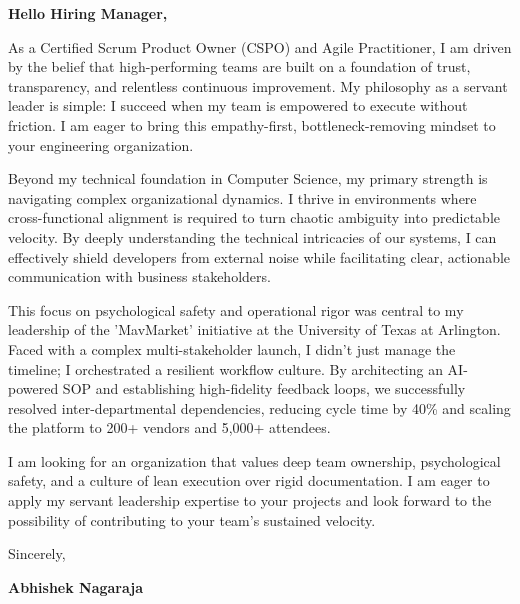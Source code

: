 \documentclass[11pt,letterpaper]{article} %
\begin{document}
\vspace{1.5em}

\textbf{Hello Hiring Manager,}

As a Certified Scrum Product Owner (CSPO) and Agile Practitioner, I am driven by the belief that high-performing teams are built on a foundation of trust, transparency, and relentless continuous improvement. My philosophy as a servant leader is simple: I succeed when my team is empowered to execute without friction. I am eager to bring this empathy-first, bottleneck-removing mindset to your engineering organization.

Beyond my technical foundation in Computer Science, my primary strength is navigating complex organizational dynamics. I thrive in environments where cross-functional alignment is required to turn chaotic ambiguity into predictable velocity. By deeply understanding the technical intricacies of our systems, I can effectively shield developers from external noise while facilitating clear, actionable communication with business stakeholders.

This focus on psychological safety and operational rigor was central to my leadership of the 'MavMarket' initiative at the University of Texas at Arlington. Faced with a complex multi-stakeholder launch, I didn't just manage the timeline; I orchestrated a resilient workflow culture. By architecting an AI-powered SOP and establishing high-fidelity feedback loops, we successfully resolved inter-departmental dependencies, reducing cycle time by 40\% and scaling the platform to 200+ vendors and 5,000+ attendees.

I am looking for an organization that values deep team ownership, psychological safety, and a culture of lean execution over rigid documentation. I am eager to apply my servant leadership expertise to your projects and look forward to the possibility of contributing to your team's sustained velocity.

\vspace{1.5em}
Sincerely,

\vspace{1.2em} %
\textbf{Abhishek Nagaraja}
\end{document}
